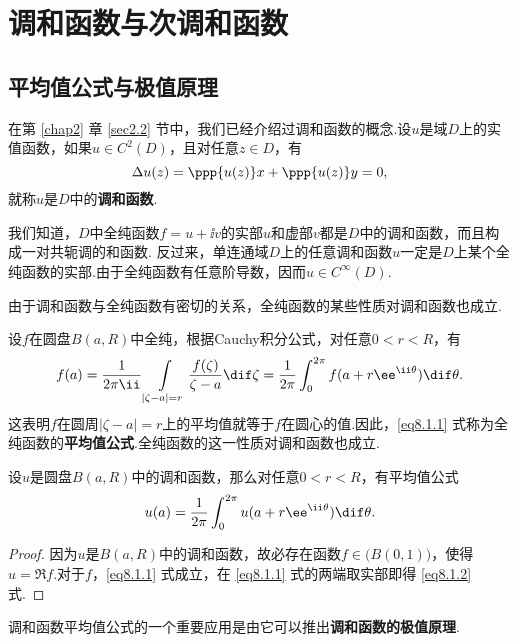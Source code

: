 \chapter{调和函数与次调和函数\label{chap8}}
\section{平均值公式与极值原理\label{sec8.1}}
在第 \ref{chap2} 章 \ref{sec2.2} 节中，我们已经介绍过调和函数的概念.设$u$是域$D$上的实值函数，如果$u\in C^2(D)$，且对任意$z\in D$，有
\[\Delta u(z)=\ppp{u(z)}x+\ppp{u(z)}y=0,\]
就称$u$是$D$中的\textbf{调和函数}.

我们知道，$D$中全纯函数$f=u+\ii v$的实部$u$和虚部$v$都是$D$中的调和函数，而且构成一对共轭调的和函数. 反过来，单连通域$D$上的任意调和函数$u$一定是$D$上某个全纯函数的实部.由于全纯函数有任意阶导数，因而$u\in C^\infty(D)$.

由于调和函数与全纯函数有密切的关系，全纯函数的某些性质对调和函数也成立.

设$f$在圆盘$B(a,R)$中全纯，根据Cauchy积分公式，对任意$0<r<R$，有
\begin{equation}\label{eq8.1.1}
f(a)=\frac1{2\pi\ii}\int\limits_{|\zeta-a|=r}\frac{f(\zeta)}{\zeta-a}\dif \zeta
=\frac1{2\pi}\int_0^{2\pi}f(a+r\ee^{\ii\theta})\dif \theta.
\end{equation}
这表明$f$在圆周$|\zeta-a|=r$上的平均值就等于$f$在圆心的值.因此，\eqref{eq8.1.1} 式称为全纯函数的\textbf{平均值公式}.全纯函数的这一性质对调和函数也成立.

\begin{theorem}\label{thm8.1.1}
设$u$是圆盘$B(a,R)$中的调和函数，那么对任意$0<r<R$，有平均值公式
\begin{equation}\label{eq8.1.2}
u(a)=\frac1{2\pi}\int_0^{2\pi}u(a+r\ee^{\ii\theta})\dif \theta.
\end{equation}
\end{theorem}
\begin{proof}
因为$u$是$B(a,R)$中的调和函数，故必存在函数$f\in\big(B(0,1)\big)$，使得$u=\Re f$.对于$f$，\eqref{eq8.1.1} 式成立，在 \eqref{eq8.1.1} 式的两端取实部即得 \eqref{eq8.1.2} 式.
\end{proof}

调和函数平均值公式的一个重要应用是由它可以推出\textbf{调和函数的极值原理}.

